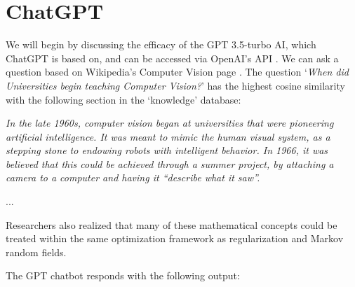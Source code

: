 \documentclass{article}
\newenvironment{itquote}
  {\begin{displayquote}\itshape}
  {\end{displayquote}\ignorespacesafterend}
\begin{document}
\section{ChatGPT}


    

We will begin by discussing the efficacy of the GPT 3.5-turbo AI, which ChatGPT is based on, and can be accessed via OpenAI's API \citep{openAIAPI}. We can ask a question based on Wikipedia's Computer Vision page \citep{wikiCompVision}. The question `\textit{When did Universities begin teaching Computer Vision?}' has the highest cosine similarity with the following section in the `knowledge' database:

\begin{itquote}
    In the late 1960s, computer vision began at universities that were pioneering artificial intelligence. It was meant to mimic the human visual system, as a stepping stone to endowing robots with intelligent behavior. In 1966, it was believed that this could be achieved through a summer project, by attaching a camera to a computer and having it ``describe what it saw''.
    
    ...
    
    Researchers also realized that many of these mathematical concepts could be treated within the same optimization framework as regularization and Markov random fields.
\end{itquote}

The GPT chatbot responds with the following output:
\end{document}
